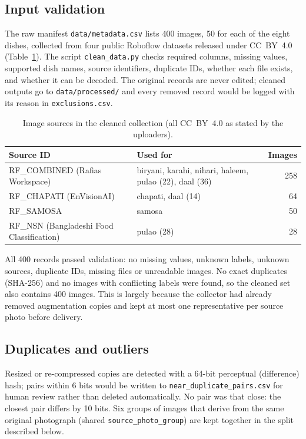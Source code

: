 \documentclass[11pt,a4paper]{article}
\begin{document}
\subsection{Input validation}
The raw manifest \texttt{data/metadata.csv} lists 400 images, 50 for each of the eight dishes, collected from four public Roboflow datasets released under CC~BY~4.0 (Table~\ref{tab:sources}). The script \texttt{clean\_data.py} checks required columns, missing values, supported dish names, source identifiers, duplicate IDs, whether each file exists, and whether it can be decoded. The original records are never edited; cleaned outputs go to \texttt{data/processed/} and every removed record would be logged with its reason in \texttt{exclusions.csv}.

\begin{table}[h]
\centering
\begin{tabular}{lp{5.6cm}r}
\hline
Source ID & Used for & Images \\ \hline
RF\_COMBINED (Rafias Workspace) & biryani, karahi, nihari, haleem, pulao (22), daal (36) & 258 \\
RF\_CHAPATI (EnVisionAI) & chapati, daal (14) & 64 \\
RF\_SAMOSA & samosa & 50 \\
RF\_NSN (Bangladeshi Food Classification) & pulao (28) & 28 \\ \hline
\end{tabular}
\caption{Image sources in the cleaned collection (all CC~BY~4.0 as stated by the uploaders).}
\label{tab:sources}
\end{table}

All 400 records passed validation: no missing values, unknown labels, unknown sources, duplicate IDs, missing files or unreadable images. No exact duplicates (SHA-256) and no images with conflicting labels were found, so the cleaned set also contains 400 images. This is largely because the collector had already removed augmentation copies and kept at most one representative per source photo before delivery.

\subsection{Duplicates and outliers}
Resized or re-compressed copies are detected with a 64-bit perceptual (difference) hash; pairs within 6 bits would be written to \texttt{near\_duplicate\_pairs.csv} for human review rather than deleted automatically. No pair was that close: the closest pair differs by 10 bits. Six groups of images that derive from the same original photograph (shared \texttt{source\_photo\_group}) are kept together in the split described below.
\end{document}
